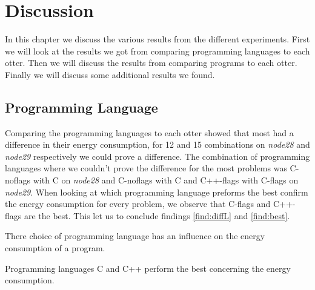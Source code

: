 \chapter{Discussion}
\label{ch:discussion}
In this chapter we discuss the various results from the different experiments. First we will look at the results we got from comparing programming languages to each otter. Then we will discuss the results from comparing programs to each otter. Finally we will discuss some additional results we found.



\section{Programming Language}
Comparing the programming languages to each otter showed that most had a difference in their energy consumption, for 12 and 15 combinations on \textit{node28} and \textit{node29} respectively we could prove a difference. The combination of programming languages where we couldn't prove the difference for the most problems was C-noflags with C on \textit{node28} and C-noflags with C and C++-flags with C-flags on \textit{node29}. When looking at which programming language preforms the best confirm the energy consumption for every problem, we observe that C-flags and C++-flags are the best. This let us to conclude findings \ref{find:diffL} and \ref{find:best}.\\

\begin{finding}
	There choice of programming language has an influence on the energy consumption of a program.
	\label{find:diffL}
\end{finding}

\begin{finding}
	Programming languages C and C++ perform the best concerning the energy consumption.
	\label{find:best}
\end{finding}

